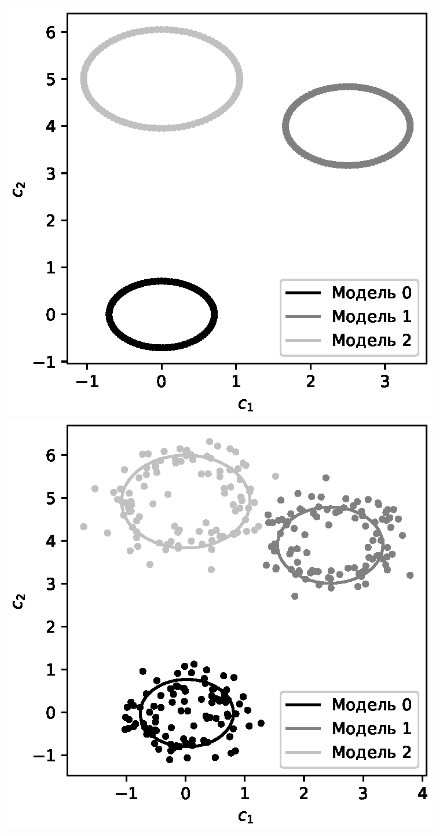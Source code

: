 \documentclass[12pt]{a&t}
\begin{document}
{\begin{figure}[h!]
	\includegraphics[height = 0.2\textheight]{900.eps}
	\includegraphics[height = 0.2\textheight]{901.eps}

\end{figure}}
\end{document}
